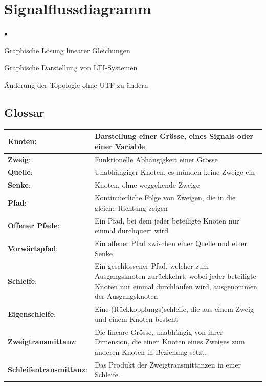 \section{Signalflussdiagramm }
\begin{list}{$\bullet$}{\setlength{\itemsep}{0cm} \setlength{\parsep}{0cm} \setlength{\topsep}{0cm}} 
  \item Graphische Lösung linearer Gleichungen
  \item Graphische Darstellung von LTI-Systemen
  \item Änderung der Topologie ohne UTF zu ändern
\end{list}

\subsection{Glossar }
  \begin{tabular}{|m{4cm} | m{14cm}|}
    \hline
      \textbf{Knoten}: &
      Darstellung einer Grösse, eines Signals oder einer Variable \\
    \hline
      \textbf{Zweig}: &
      Funktionelle Abhängigkeit einer Grösse \\
    \hline
      \textbf{Quelle}: &
      Unabhängiger Knoten, es münden keine Zweige ein \\
    \hline
      \textbf{Senke}: &
      Knoten, ohne weggehende Zweige \\
    \hline
      \textbf{Pfad}: &
      Kontinuierliche Folge von Zweigen, die in die gleiche Richtung zeigen \\
    \hline
      \textbf{Offener Pfade}: &
      Ein Pfad, bei dem jeder beteiligte Knoten nur einmal durchquert wird \\
      \textbf{Vorwärtspfad}: &
      Ein offener Pfad zwischen einer Quelle und einer Senke \\
    \hline
      \textbf{Schleife}: &
      Ein geschlossener Pfad, welcher zum Ausgangsknoten zurückkehrt, 
      wobei jeder beteiligte Knoten nur einmal durchlaufen wird, ausgenommen der
      Ausgangsknoten \\
    \hline
      \textbf{Eigenschleife}: &
      Eine (Rückkopplungs)schleife, die aus einem Zweig und einem Knoten besteht \\
    \hline
      \textbf{Zweigtransmittanz}: &
      Die lineare Grösse, unabhängig von ihrer Dimension, 
      die einen Knoten eines Zweiges zum anderen Knoten in Beziehung setzt. \\
    \hline
      \textbf{Schleifentransmittanz}: &
      Das Produkt der Zweigtransmittanzen in einer Schleife. \\
    \hline
  \end{tabular}

